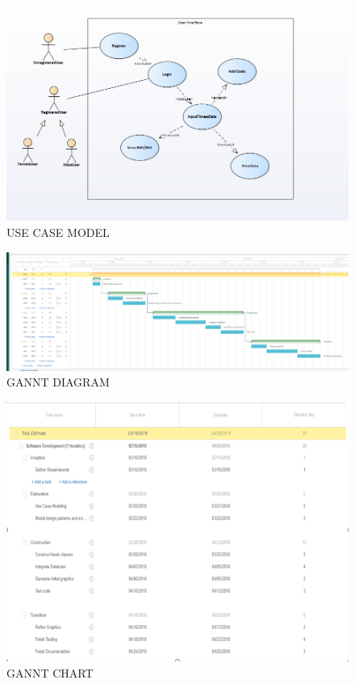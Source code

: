 \documentclass[10pt]{article}
\begin{document}
\begin{figure}[p!]
	\begin{center}
		\includegraphics[width=\columnwidth]{UseCaseModel.jpg}
		\caption{{USE CASE MODEL
				{\label{div-915296}}%
		}}
	\end{center}
\end{figure}


\begin{figure}[p!]
	\begin{center}
		\includegraphics[width=\columnwidth]{Gannt1.png}
		\caption{{GANNT DIAGRAM
				{\label{div-327881}}%
		}}
	\end{center}
\end{figure}


\begin{figure}[p!]
	\begin{center}
		\includegraphics[width=\columnwidth]{GANNTCHART.png}
		\caption{{GANNT CHART
				{\label{div-381784}}%
		}}
	\end{center}
\end{figure}
\end{document}
